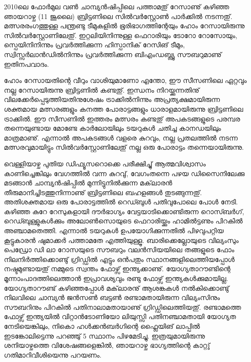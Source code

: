 ﻿
\vskip 2pt
\enlargethispage*{2\baselineskip}

2010ലെ ഫോര്‍മുല വണ്‍ ചാമ്പ്യന്‍ഷിപ്പിലെ പത്താമതു് റേസാണു് കഴിഞ്ഞ ഞായറാഴ്ച (11 ജൂലൈ) ബ്രിട്ടണിലെ സില്‍വര്‍സ്റ്റോണ്‍ പാര്‍ക്കില്‍ 
നടന്നതു്. മത്സരരംഗത്തുള്ള പന്ത്രണ്ടു ടീമുകളില്‍ ഭൂരിഭാഗത്തിന്റേയും ഹോം റേസായിരുന്നു സില്‍വര്‍സ്റ്റോണിലേതു്. ഇറ്റലിയിനിന്നുള്ള ഫെറാരിയും ടോറോ റോസോയും, സ്പെയിനിനിന്നും പ്രവര്‍ത്തിക്കുന്ന ഹിസ്പാനിക് റേസിങ് ടീമും, സ്വിസ്സര്‍ലാന്‍ഡില്‍നിന്നും പ്രവര്‍ത്തിക്കുന്ന ബിഎംഡബ്ല്യൂ സൗബറുമാണു് ഇതിനപവാദം.

ഹോം റേസായതിന്റെ വീറും വാശിയുമാണോ എന്തോ, ഈ സീസണിലെ ഏറ്റവും നല്ല റേസായിരുന്നു ബ്രിട്ടണില്‍ കണ്ടതു്.   
ഇന്ധനം നിറയ്ക്കുന്നതിനു് വിലക്കേര്‍പ്പെടുത്തിയതിനുശേഷം ട്രാക്കില്‍നിന്നും അപ്രത്യക്ഷമായിരുന്ന ശക്തമായ മത്സരങ്ങളും കനത്ത
 പോരാട്ടങ്ങളും ധാരാളമായിരുന്നു ബ്രിട്ടണിലെ ട്രാക്കില്‍. ഈ സീസണില്‍ ഇത്തരം മത്സരം കണ്ടതു് അപകടങ്ങളുടെ പരമ്പര 
 തന്നെയുണ്ടായ മോണ്ടേ കാര്‍ലോയിലും ടയറുകള്‍ ചതിച്ച കാനഡയിലും മാത്രമാണു്. എന്നാല്‍ അപകടങ്ങള്‍ വളരെ കുറവും, 
 നല്ല പ്രതലത്തില്‍ നടന്ന മത്സരവുമായിട്ടും സില്‍വര്‍സ്റ്റോണിലേതു് നല്ല ഒരു പോരാട്ടം തന്നെയായിരുന്നു.

വെള്ളിയാഴ്ച പുതിയ ഡിഫ്യൂസറൊക്കെ പരീക്ഷിച്ചു് ആത്മവിശ്വാസം കാണിച്ചെങ്കിലും വേഗത്തില്‍ വന്ന കുറവു്, വേഗംതന്നെ പഴയ 
ഡിസൈനിലേക്കു മടങ്ങാന്‍ ചാമ്പ്യന്‍ഷിപ്പില്‍ മുന്നിട്ടുനില്‍ക്കുന്ന മക്‌ലാരന്‍ തീരുമാനിച്ചിടത്തുനിന്നാണു് ബ്രിട്ടണിലെ ബഹളങ്ങള്‍ 
തുടങ്ങുന്നതു്. അതിശക്തമായ ഒരു പോരാട്ടത്തില്‍ റെഡ്ബുള്‍ പതിവുപോലെ പോള്‍ നേടി. കഴിഞ്ഞ കുറേ റേസുകളായി ദൗര്‍ഭാഗ്യം 
വേട്ടയാടിക്കൊണ്ടിരുന്ന റൊസ്ബര്‍ഗ്, റെഡ്ബുള്ളുകള്‍ക്കും അലോണ്‍സൊയുടെ ഫെറാരിയ്ക്കും ഹാമില്‍ട്ടണും പിറകില്‍ അഞ്ചാമതെത്തി. 
എന്നാല്‍ ടയറുകള്‍ ഉപയോഗിക്കുന്നതില്‍ പിഴവുപറ്റിയ കൂട്ടുകാരന്‍ ഷുമാക്കര്‍ പത്താമതേ എത്തിയുള്ളൂ. ബാരിക്കെല്ലോയുടെ വില്യംസും 
പെഡ്രോ ഡി ലാ റോസയുടെ സൗബറും വലന്‍സിയയിലെ തങ്ങളുടെ ഫോം നിലനിര്‍ത്തിക്കൊണ്ടു് ഗ്രിഡ്ഡില്‍ എട്ടും ഒന്‍പതും 
സ്ഥാനങ്ങളിലെത്തിയപ്പോള്‍ നഷ്ടമുണ്ടായതു് നമ്മുടെ സ്വന്തം ഫോഴ്സ് ഇന്ത്യക്കാണു്. യോഗ്യതാറൗണ്ടിന്റെ മൂന്നാംപാദത്തിലെത്താന്‍ 
ഇപ്രാവശ്യവും രണ്ടു ഫോഴ്സ് ഇന്ത്യകള്‍ക്കുമായില്ല. യോഗ്യതാറൗണ്ട് കഴിഞ്ഞപ്പോള്‍ മക്‌ലാരനു് ആശങ്കകള്‍ നല്‍കിക്കൊണ്ടു് നിലവിലെ 
ചാമ്പ്യന്‍ ജന്‍സണ്‍ ബട്ടണ്‍ രണ്ടാമതായിരുന്ന വില്യംസിനും സൗബറിനും പിറകില്‍ പതിനാലാമതായാണു് ഗ്രിഡ്ഡിലെത്തിയതു്. രണ്ടാമത്തെ 
ഫോഴ്സ് ഇന്ത്യയില്‍ വിറ്റാന്‍ടോണിയോ ലിയുസ്സി പതിനഞ്ചാമതായി യോഗ്യത നേടിയെങ്കിലും, നികൊ ഹള്‍ക്കന്‍ബര്‍ഗിന്റെ ഫ്ലൈയിങ് 
ലാപ്പില്‍ ഇടങ്കോലിട്ടെന്നു പറഞ്ഞു്  5 സ്ഥാനം പിഴമേടിച്ചു. ഇത്രയുമായിരുന്നു ശനിയാഴ്ചത്തെ വിശേഷങ്ങളെങ്കില്‍, ഞായറാഴ്ച ഭാഗ്യത്തിന്റെ 
കാറ്റു് ഗതിമാറിവീശിയെന്നു പറയണം.

